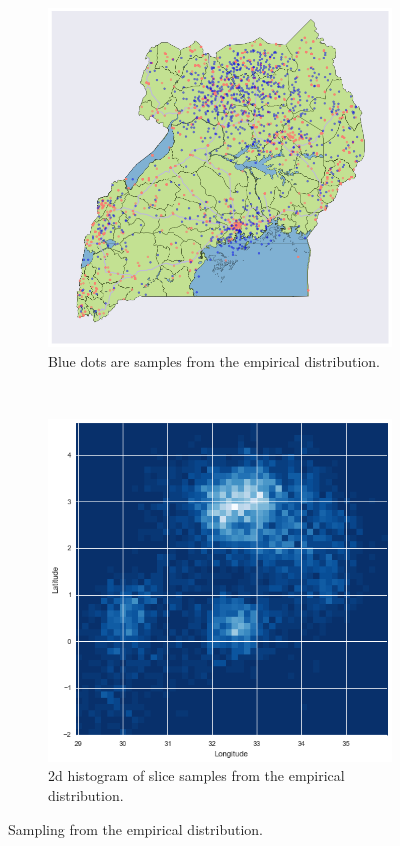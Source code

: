 \documentclass{article} %
\begin{document}
\begin{figure}
  \centering
  \begin{subfigure}[b]{0.5\textwidth}
    \centering
    \includegraphics[width=\textwidth]{figures/1000-slice-samples}
    \caption{Blue dots are samples from the empirical distribution.}
    \label{fig:sampled-conflicts}
  \end{subfigure}~\begin{subfigure}[b]{0.5\textwidth}
    \centering
    \includegraphics[width=\textwidth]{figures/histogram}
    \caption{2d histogram of slice samples from the empirical distribution.}
    \label{fig:histogram}
  \end{subfigure}
  \caption{Sampling from the empirical distribution.}
\end{figure}
\end{document}
